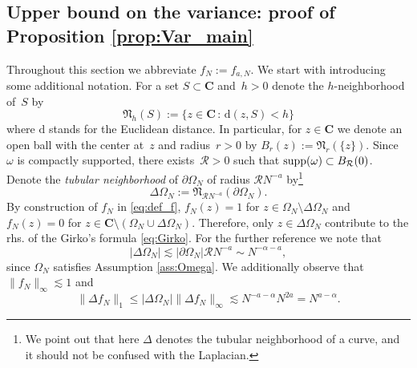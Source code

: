\documentclass[10pt]{amsart}
\numberwithin{equation}{section}
\newcommand{\C}{\mathbf{C}}
\begin{document}
\subsection{Upper bound on the variance: proof of Proposition \ref{prop:Var_main}}\label{sec:Var}

Throughout this section we abbreviate $f_N:=f_{a,N}$. We start with introducing some additional notation. For a set $S\subset\C$ and~$h>0$ denote the $h$-neighborhood of~$S$ by
\begin{equation}
{\mathfrak{N}}_h(S):= \{ z\in \C\, :\, \mathrm{d}(z,S)<h\}
\label{eq:def_Nh}
\end{equation}
where $\mathrm{d}$ stands for the Euclidean distance. In particular, for $z\in\C$ we denote an open ball with the center at~$z$ and radius~$r>0$ by $B_r(z):={\mathfrak{N}}_r(\{z\})$. Since~$\omega$ is compactly supported, there exists~$\mathcal{R}>0$ such that ${\rm{supp}}(\omega)\subset B_\mathcal{R}(0)$. Denote the \emph{tubular neighborhood} of $\partial\Omega_N$ of radius $\mathcal{R}N^{-a}$ by\footnote{We point out that here $\Delta$ denotes the tubular neighborhood of a curve, and it should not be confused with the Laplacian.}
\begin{equation}
\Delta\Omega_N:= {\mathfrak{N}}_{\mathcal{R}N^{-a}}(\partial\Omega_N).
\end{equation}
By construction of $f_N$ in \eqref{eq:def_f}, $f_N(z)=1$ for $z\in\Omega_N\setminus\Delta \Omega_N$ and $f_N(z)=0$ for  $z\in\C\setminus\left(\Omega_N\cup\Delta \Omega_N\right)$. Therefore, only $z\in \Delta\Omega_N$ contribute to the rhs. of the Girko's formula \eqref{eq:Girko}. For the further reference we note that
\begin{equation}
|\Delta\Omega_N|\lesssim |\partial \Omega_N|\mathcal{R}N^{-a}\sim N^{-\alpha-a},
\label{eq:Delta_Omega_area}
\end{equation}
since $\Omega_N$ satisfies Assumption \ref{ass:Omega}. We additionally observe that $\lVert f_N\rVert_\infty\lesssim 1$ and
\begin{equation}
\lVert \Delta f_N\rVert_{1} \le |\Delta \Omega_N|\|\Delta f_N\|_\infty \lesssim N^{-a-\alpha}N^{2a}=N^{a-\alpha}.
\label{eq:Delta_f_L1}
\end{equation}
\end{document}
